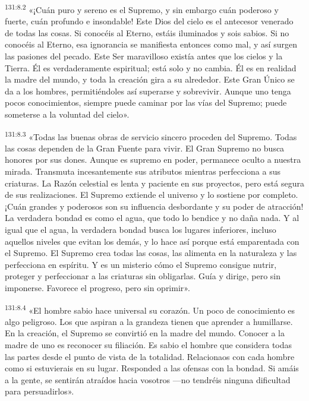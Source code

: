 \par
\textsuperscript{131:8.2} «¡Cuán puro y sereno es el Supremo, y sin embargo cuán poderoso y fuerte, cuán profundo e insondable! Este Dios del cielo es el antecesor venerado de todas las cosas. Si conocéis al Eterno, estáis iluminados y sois sabios. Si no conocéis al Eterno, esa ignorancia se manifiesta entonces como mal, y así surgen las pasiones del pecado. Este Ser maravilloso existía antes que los cielos y la Tierra. Él es verdaderamente espiritual; está solo y no cambia. Él es en realidad la madre del mundo, y toda la creación gira a su alrededor. Este Gran Único se da a los hombres, permitiéndoles así superarse y sobrevivir. Aunque uno tenga pocos conocimientos, siempre puede caminar por las vías del Supremo; puede someterse a la voluntad del cielo».

\par
\textsuperscript{131:8.3} «Todas las buenas obras de servicio sincero proceden del Supremo. Todas las cosas dependen de la Gran Fuente para vivir. El Gran Supremo no busca honores por sus dones. Aunque es supremo en poder, permanece oculto a nuestra mirada. Transmuta incesantemente sus atributos mientras perfecciona a sus criaturas. La Razón celestial es lenta y paciente en sus proyectos, pero está segura de sus realizaciones. El Supremo extiende el universo y lo sostiene por completo. ¡Cuán grandes y poderosos son su influencia desbordante y su poder de atracción! La verdadera bondad es como el agua, que todo lo bendice y no daña nada. Y al igual que el agua, la verdadera bondad busca los lugares inferiores, incluso aquellos niveles que evitan los demás, y lo hace así porque está emparentada con el Supremo. El Supremo crea todas las cosas, las alimenta en la naturaleza y las perfecciona en espíritu. Y es un misterio cómo el Supremo consigue nutrir, proteger y perfeccionar a las criaturas sin obligarlas. Guía y dirige, pero sin imponerse. Favorece el progreso, pero sin oprimir».

\par
\textsuperscript{131:8.4} «El hombre sabio hace universal su corazón. Un poco de conocimiento es algo peligroso. Los que aspiran a la grandeza tienen que aprender a humillarse. En la creación, el Supremo se convirtió en la madre del mundo. Conocer a la madre de uno es reconocer su filiación. Es sabio el hombre que considera todas las partes desde el punto de vista de la totalidad. Relacionaos con cada hombre como si estuvierais en su lugar. Responded a las ofensas con la bondad. Si amáis a la gente, se sentirán atraídos hacia vosotros ---no tendréis ninguna dificultad para persuadirlos».

